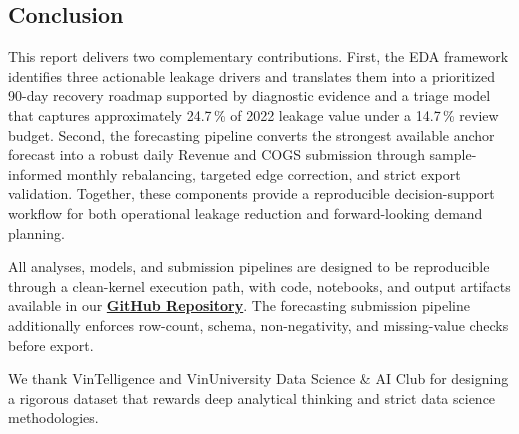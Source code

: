 \documentclass[10pt]{article}
\begin{document}
\subsection{Conclusion}
This report delivers two complementary contributions. First, the EDA framework identifies three actionable leakage drivers and translates them into a prioritized 90-day recovery roadmap supported by diagnostic evidence and a triage model that captures approximately 24.7\,\% of 2022 leakage value under a 14.7\,\% review budget. Second, the forecasting pipeline converts the strongest available anchor forecast into a robust daily Revenue and COGS submission through sample-informed monthly rebalancing, targeted edge correction, and strict export validation. Together, these components provide a reproducible decision-support workflow for both operational leakage reduction and forward-looking demand planning.

All analyses, models, and submission pipelines are designed to be reproducible through a clean-kernel execution path, with code, notebooks, and output artifacts available in our \textbf{\href{https://github.com/thtcsec/Datathon2026-TheGridbreakers-GenCore.git}{GitHub Repository}}. The forecasting submission pipeline additionally enforces row-count, schema, non-negativity, and missing-value checks before export.

\begin{ack}
We thank VinTelligence and VinUniversity Data Science \& AI Club for designing a rigorous dataset that rewards deep analytical thinking and strict data science methodologies.
\end{ack}
\end{document}
